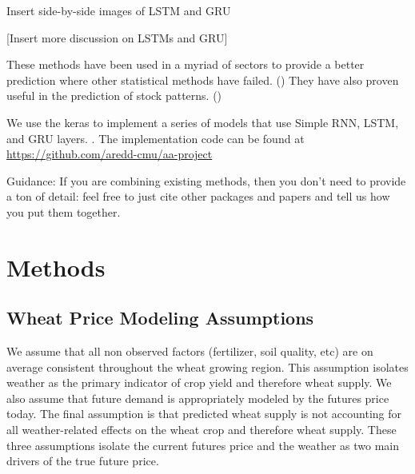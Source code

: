 \documentclass[twoside,11pt]{article}
\begin{document}
Insert side-by-side images of LSTM and GRU

[Insert more discussion on LSTMs and GRU]

These methods have been used in a myriad of sectors to provide a better prediction where other statistical methods have failed. (\cite{Ugurlu2018}) They have also proven useful in the prediction of stock patterns. (\cite{YoungohcYoon}) 

We use the keras to implement a series of models that use Simple RNN, LSTM, and GRU layers. \cite{chollet2015keras}. The implementation code can be found at \url{https://github.com/aredd-cmu/aa-project}


Guidance:
If you are combining existing methods, then you don't need to provide a ton of detail: feel free to just cite other packages and papers and tell us how you put them together.

\section{Methods} \label{Methods}

\subsection{Wheat Price Modeling Assumptions}
We assume that all non observed factors (fertilizer, soil quality, etc) are on average consistent throughout the wheat growing region. This assumption isolates weather as the primary indicator of crop yield and therefore wheat supply. We also assume that future demand is appropriately modeled by the futures price today. The final assumption is that predicted wheat supply is not accounting for all weather-related effects on the wheat crop and therefore wheat supply. These three assumptions isolate the current futures price and the weather as two main drivers of the true future price. 
\end{document}
